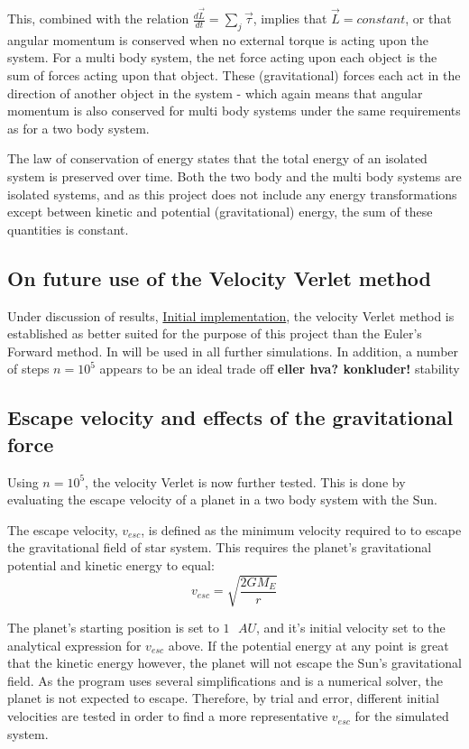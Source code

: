 \documentclass[%
oneside,                 %
final,                   %
10pt]{article}
\begin{document}
This, combined with the relation $\frac{d \vec{L}}{dt} = \sum_j \vec{\tau}$, implies that $\vec{L} = constant$, or that angular momentum is conserved when no external torque is acting upon the system. For a multi body system, the net force acting upon each object is the sum of forces acting upon that object. These (gravitational) forces each act in the direction of another object in the system - which again means that angular momentum is also conserved for multi body systems under the same requirements as for a two body system. \newline

The law of conservation of energy states that the total energy of an isolated system is preserved over time. Both the two body and  the multi body systems are isolated systems, and as this project does not include any energy transformations except between kinetic and potential (gravitational) energy, the sum of these quantities  is constant. \newline

\subsection{On future use of the Velocity Verlet method}
Under discussion of results, \hyperref[subsec:Init_implm]{Initial implementation}, the velocity Verlet method is established as better suited for the purpose of this project than the Euler's Forward method. In will be used in all further simulations. In addition, a number of steps $n=10^5$ appears to be an ideal trade off \textbf{eller hva? konkluder!} stability
\subsection{Escape velocity and effects of the gravitational force}
Using $n=10^5$, the velocity Verlet is now further tested. This is done by evaluating the escape velocity of a planet in a two body system with the Sun.  \newline

The escape velocity, $v_{esc}$, is defined as the minimum velocity required to to escape the gravitational field of star system. This requires the planet's gravitational potential and kinetic energy to equal:
\begin{equation}
v_{esc} = \sqrt{\frac{2 G M_E}{r}}
\end{equation}

The planet's starting position is set to $1 \text{ } AU$, and it's initial velocity set to the analytical expression for $v_{esc}$ above. If the potential energy at any point is great that the kinetic energy however, the planet will not escape the Sun's gravitational field. As the program uses several simplifications and is a numerical solver, the planet is not expected to escape. Therefore, by trial and error, different initial velocities are tested in order to find a more representative $v_{esc}$ for the simulated system.\newline
\end{document}
